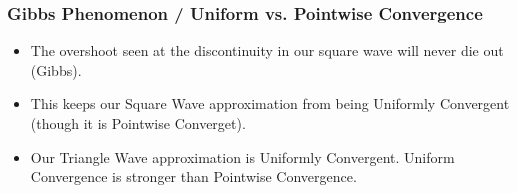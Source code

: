 \documentclass{beamer}
\begin{document}
\begin{frame}
   \frametitle{Gibbs Phenomenon / Uniform vs. Pointwise Convergence}
   \begin{block}{}
      \begin{itemize}
         \item The overshoot seen at the discontinuity in our square wave will never die out (Gibbs). 
         \item This keeps our Square Wave approximation from being Uniformly Convergent (though it is Pointwise Converget).
         \item Our Triangle Wave approximation is Uniformly Convergent. Uniform Convergence is stronger than Pointwise Convergence.
      \end{itemize}
   \end{block}
\end{frame}
\end{document}
